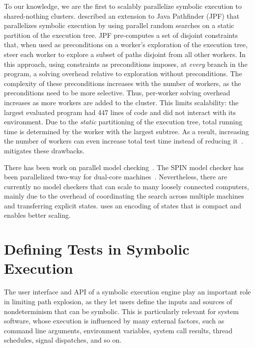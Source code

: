 To our knowledge, we are the first to scalably parallelize symbolic execution to shared-nothing clusters.
%
\cite{parallelSymbex} described an extension to Java Pathfinder (JPF) that parallelizes symbolic execution by using parallel random searches on a static partition of the execution tree.  JPF pre-computes a set of disjoint constraints that, when used as preconditions on a worker's exploration of the execution tree, steer each worker to explore a subset of paths disjoint from all other workers.  In this approach, using constraints as preconditions imposes, at {\em every} branch in the program, a solving overhead relative to exploration without preconditions.  The complexity of these preconditions increases with the number of workers, as the preconditions need to be more selective.  Thus, per-worker solving overhead increases as more workers are added to the cluster.  This limits scalability: the largest evaluated program had 447 lines of code and did not interact with its environment.  Due to the {\em static} partitioning of the execution tree, total running time is determined by the worker with the largest subtree.  As a result, increasing the number of workers can even increase total test time instead of reducing it~\cite{parallelSymbex}.  \cnine mitigates these drawbacks.

There has been work on parallel model checking~\cite{parallelMurphi,distributed-spin,loadBalModelchecking,spin:multicore-modelchecking,modelCheckBDD}.  The SPIN model checker has been parallelized two-way for dual-core machines~\cite{parallelSPIN}. Nevertheless, there are currently no model checkers that can scale to many loosely connected computers, mainly due to the overhead of coordinating the search across multiple machines and transferring explicit states. \cnine uses an encoding of states that is compact and enables better scaling.


\section{Defining Tests in Symbolic Execution}
\label{sec:relwork:symtests}

The user interface and API of a symbolic execution engine play an important role in limiting path explosion, as they let users define the inputs and sources of nondeterminism that can be symbolic.  This is particularly relevant for system software, whose execution is influenced by many external factors, such as command line arguments, environment variables, system call results, thread schedules, signal dispatches, and so on.


